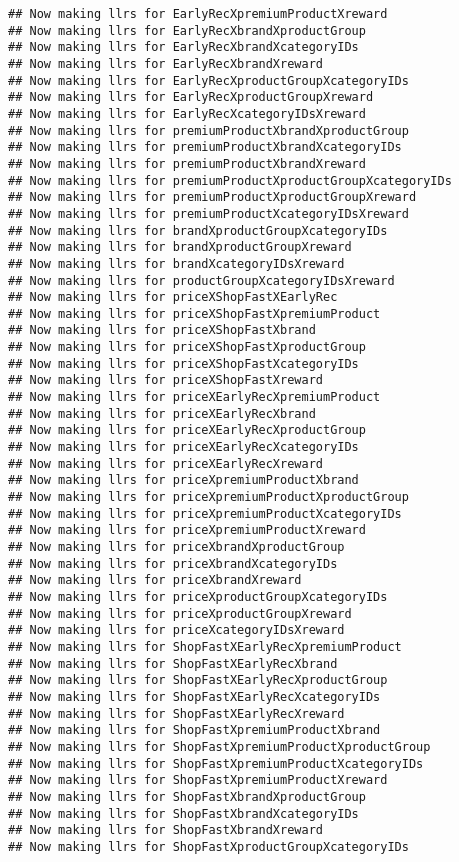 \documentclass[10pt]{report}
\begin{document}
\begin{verbatim}
## Now making llrs for EarlyRecXpremiumProductXreward
## Now making llrs for EarlyRecXbrandXproductGroup
## Now making llrs for EarlyRecXbrandXcategoryIDs
## Now making llrs for EarlyRecXbrandXreward
## Now making llrs for EarlyRecXproductGroupXcategoryIDs
## Now making llrs for EarlyRecXproductGroupXreward
## Now making llrs for EarlyRecXcategoryIDsXreward
## Now making llrs for premiumProductXbrandXproductGroup
## Now making llrs for premiumProductXbrandXcategoryIDs
## Now making llrs for premiumProductXbrandXreward
## Now making llrs for premiumProductXproductGroupXcategoryIDs
## Now making llrs for premiumProductXproductGroupXreward
## Now making llrs for premiumProductXcategoryIDsXreward
## Now making llrs for brandXproductGroupXcategoryIDs
## Now making llrs for brandXproductGroupXreward
## Now making llrs for brandXcategoryIDsXreward
## Now making llrs for productGroupXcategoryIDsXreward
## Now making llrs for priceXShopFastXEarlyRec
## Now making llrs for priceXShopFastXpremiumProduct
## Now making llrs for priceXShopFastXbrand
## Now making llrs for priceXShopFastXproductGroup
## Now making llrs for priceXShopFastXcategoryIDs
## Now making llrs for priceXShopFastXreward
## Now making llrs for priceXEarlyRecXpremiumProduct
## Now making llrs for priceXEarlyRecXbrand
## Now making llrs for priceXEarlyRecXproductGroup
## Now making llrs for priceXEarlyRecXcategoryIDs
## Now making llrs for priceXEarlyRecXreward
## Now making llrs for priceXpremiumProductXbrand
## Now making llrs for priceXpremiumProductXproductGroup
## Now making llrs for priceXpremiumProductXcategoryIDs
## Now making llrs for priceXpremiumProductXreward
## Now making llrs for priceXbrandXproductGroup
## Now making llrs for priceXbrandXcategoryIDs
## Now making llrs for priceXbrandXreward
## Now making llrs for priceXproductGroupXcategoryIDs
## Now making llrs for priceXproductGroupXreward
## Now making llrs for priceXcategoryIDsXreward
## Now making llrs for ShopFastXEarlyRecXpremiumProduct
## Now making llrs for ShopFastXEarlyRecXbrand
## Now making llrs for ShopFastXEarlyRecXproductGroup
## Now making llrs for ShopFastXEarlyRecXcategoryIDs
## Now making llrs for ShopFastXEarlyRecXreward
## Now making llrs for ShopFastXpremiumProductXbrand
## Now making llrs for ShopFastXpremiumProductXproductGroup
## Now making llrs for ShopFastXpremiumProductXcategoryIDs
## Now making llrs for ShopFastXpremiumProductXreward
## Now making llrs for ShopFastXbrandXproductGroup
## Now making llrs for ShopFastXbrandXcategoryIDs
## Now making llrs for ShopFastXbrandXreward
## Now making llrs for ShopFastXproductGroupXcategoryIDs

\end{verbatim}
\end{document}
